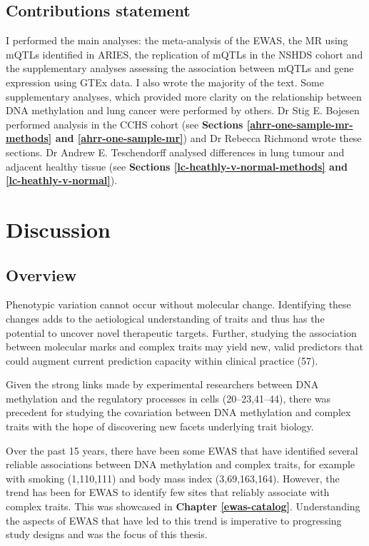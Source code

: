 \documentclass[11pt,oneside]{bristolthesis}
\begin{document}
\hypertarget{contributions-statement-07}{%
\section{Contributions statement}\label{contributions-statement-07}}

I performed the main analyses: the meta-analysis of the EWAS, the MR using mQTLs identified in ARIES, the replication of mQTLs in the NSHDS cohort and the supplementary analyses assessing the association between mQTLs and gene expression using GTEx data. I also wrote the majority of the text. Some supplementary analyses, which provided more clarity on the relationship between DNA methylation and lung cancer were performed by others. Dr Stig E. Bojesen performed analysis in the CCHS cohort (see \textbf{Sections \ref{ahrr-one-sample-mr-methods} and \ref{ahrr-one-sample-mr}}) and Dr Rebecca Richmond wrote these sections. Dr Andrew E. Teschendorff analysed differences in lung tumour and adjacent healthy tissue (see \textbf{Sections \ref{lc-heathly-v-normal-methods} and \ref{lc-heathly-v-normal}}).

\hypertarget{discussion-thesis}{%
\chapter{Discussion}\label{discussion-thesis}}

\hypertarget{overview-08}{%
\section{Overview}\label{overview-08}}

Phenotypic variation cannot occur without molecular change. Identifying these changes adds to the aetiological understanding of traits and thus has the potential to uncover novel therapeutic targets. Further, studying the association between molecular marks and complex traits may yield new, valid predictors that could augment current prediction capacity within clinical practice (57).

Given the strong links made by experimental researchers between DNA methylation and the regulatory processes in cells (20--23,41--44), there was precedent for studying the covariation between DNA methylation and complex traits with the hope of discovering new facets underlying trait biology.

Over the past 15 years, there have been some EWAS that have identified several reliable associations between DNA methylation and complex traits, for example with smoking (1,110,111) and body mass index (3,69,163,164). However, the trend has been for EWAS to identify few sites that reliably associate with complex traits. This was showcased in \textbf{Chapter \ref{ewas-catalog}}. Understanding the aspects of EWAS that have led to this trend is imperative to progressing study designs and was the focus of this thesis.
\end{document}
